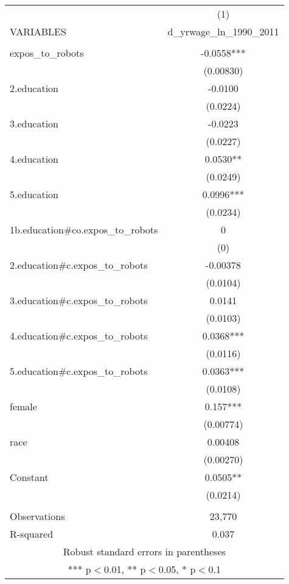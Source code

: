 \documentclass[]{article}
\begin{document}
\begin{tabular}{lc} \hline
 & (1) \\
VARIABLES & d\_yrwage\_ln\_1990\_2011 \\ \hline
 &  \\
expos\_to\_robots & -0.0558*** \\
 & (0.00830) \\
2.education & -0.0100 \\
 & (0.0224) \\
3.education & -0.0223 \\
 & (0.0227) \\
4.education & 0.0530** \\
 & (0.0249) \\
5.education & 0.0996*** \\
 & (0.0234) \\
1b.education\#co.expos\_to\_robots & 0 \\
 & (0) \\
2.education\#c.expos\_to\_robots & -0.00378 \\
 & (0.0104) \\
3.education\#c.expos\_to\_robots & 0.0141 \\
 & (0.0103) \\
4.education\#c.expos\_to\_robots & 0.0368*** \\
 & (0.0116) \\
5.education\#c.expos\_to\_robots & 0.0363*** \\
 & (0.0108) \\
female & 0.157*** \\
 & (0.00774) \\
race & 0.00408 \\
 & (0.00270) \\
Constant & 0.0505** \\
 & (0.0214) \\
 &  \\
Observations & 23,770 \\
 R-squared & 0.037 \\ \hline
\multicolumn{2}{c}{ Robust standard errors in parentheses} \\
\multicolumn{2}{c}{ *** p$<$0.01, ** p$<$0.05, * p$<$0.1} \\
\end{tabular}
\end{document}
